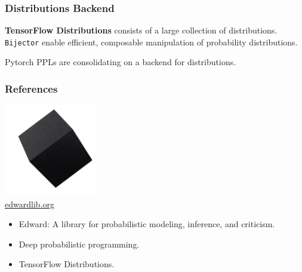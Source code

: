 \documentclass[10pt,
               xcolor={usenames,dvipsnames},
               hyperref={colorlinks,linktoc=all,citecolor=Plum,linkcolor=MidnightBlue,urlcolor=MidnightBlue},noamssymb]{beamer}
\begin{document}
\begin{frame}
\frametitle{Distributions Backend}
\vspace{-3ex}


\textbf{TensorFlow Distributions} consists of a large collection of
distributions. \texttt{Bijector} enable efficient, composable
manipulation of probability distributions.

Pytorch PPLs are consolidating on a backend for distributions.
\end{frame}


\begin{frame}
\frametitle{References}
\begin{center}
\includegraphics[width=0.3\textwidth]{img/edward.png}
\\
\large \url{edwardlib.org}
\end{center}
\vspace{1ex}

\begin{itemize}
\item
Edward: A library for probabilistic modeling, inference, and
criticism. \\
\item
Deep probabilistic programming. \\
\item
TensorFlow Distributions. \\
\end{itemize}
\end{frame}
\end{document}
